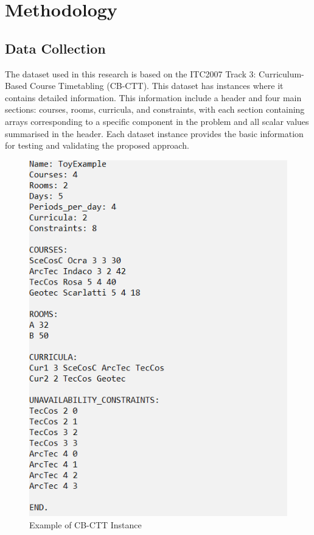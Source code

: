 \section{Methodology}
\label{sec}

\subsection{Data Collection}
\label{subsec:data_collection}
The dataset used in this research is based on the ITC2007 Track 3: Curriculum-Based Course Timetabling (CB-CTT). This dataset has instances where it contains detailed information. This information include a header and four main sections: courses, rooms, curricula, and constraints, with each section containing arrays corresponding to a specific component in the problem and all scalar values summarised in the header. Each dataset instance provides the basic information for testing and validating the proposed approach. 

\begin{figure}[] %
    \includegraphics[width=1\textwidth]{example.png}
    \caption{Example of CB-CTT Instance}
    \label{fig:example} %
\end{figure}

